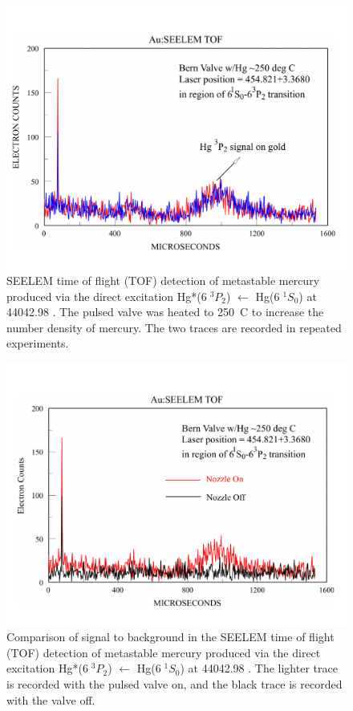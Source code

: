 \documentclass[12pt]{mitthesis}
\begin{document}
\begin{figure}
  \caption{SEELEM time of flight (TOF) detection of metastable mercury
    produced via the direct excitation Hg*($6 \; ^3P_2$) $\leftarrow$
    Hg($6 \; ^1S_0$) at 44042.98 \rcm.  The pulsed valve was heated to
    250\degrees\ C to increase the number density of mercury.  The two
    traces are recorded in repeated experiments.}
\label{fig:hg-3p2-direct}
\centering
\includegraphics[width=8in,angle=90]{hg-3p2-direct.pdf}
\end{figure}

\begin{figure}
  \caption{Comparison of signal to background in the SEELEM time of
    flight (TOF) detection of metastable mercury produced via the
    direct excitation Hg*($6 \; ^3P_2$) $\leftarrow$ Hg($6 \; ^1S_0$)
    at 44042.98 \rcm.  The lighter trace is recorded with the pulsed
    valve on, and the black trace is recorded with the valve off.}
\label{fig:hg-3p2-direct-bg}
\centering
\includegraphics[width=8in,angle=90]{hg-3p2-direct-bg.pdf}
\end{figure}
\end{document}
